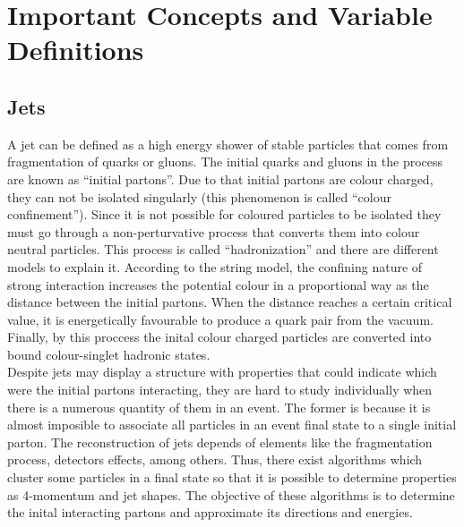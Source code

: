  \chapter{Important Concepts and Variable Definitions}\label{Important_concepts_chapter}
 
 \section{Jets}
 A jet can be defined as a high energy shower of stable particles that comes from fragmentation of quarks or gluons. The initial quarks and gluons in the process are known as ``initial partons''.
 Due to that initial partons are colour charged, they can not be isolated singularly (this phenomenon is called ``colour confinement''). Since it is not possible for coloured particles to be isolated 
 they must go through a non-perturvative process that converts them into colour neutral particles. This process is called ``hadronization'' and there are different models to explain it. According to 
 the string model, the confining nature of strong interaction increases the potential colour in a proportional way as the distance between the initial partons. When the distance reaches a certain 
 critical value, it is energetically favourable to produce a quark pair from the vacuum. Finally, by this proccess the inital colour charged particles are converted into bound colour-singlet hadronic 
 states. \\
 
 Despite jets may display a structure with properties that could indicate which were the initial partons interacting, they are hard to study individually when there is a numerous quantity of them
 in an event. The former is because it is almost imposible to associate all particles in an event final state to a single initial parton. The reconstruction of jets depends of elements like the 
 fragmentation process, detectors effects, among others. Thus, there exist algorithms which cluster some particles in a final state so that it is possible to determine properties as 4-momentum 
 and jet shapes. The objective of these algorithms is to determine the inital interacting partons and approximate its directions and energies. \\
 
